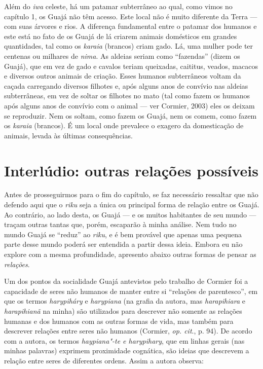 Além do \emph{iwa} celeste, há um patamar subterrâneo ao qual, como
vimos no capítulo 1, os Guajá não têm acesso. Este local não é muito
diferente da Terra --- com suas árvores e rios. A diferença fundamental
entre o patamar dos humanos e este está no fato de os Guajá de lá
criarem animais domésticos em grandes quantidades, tal como os
\emph{karaia} (brancos) criam gado. Lá, uma mulher pode ter centenas ou
milhares de \emph{nima}. As aldeias seriam como ``fazendas'' (dizem os
Guajá), que em vez de gado e cavalos teriam queixadas, caititus, veados,
macacos e diversos outros animais de criação. Esses humanos subterrâneos
voltam da caçada carregando diversos filhotes e, após alguns anos de
convívio nas aldeias subterrâneas, em vez de soltar os filhotes no mato
(tal como fazem os humanos após alguns anos de convívio com o animal ---
ver Cormier, 2003) eles os deixam se reproduzir. Nem os soltam, como
fazem os Guajá, nem os comem, como fazem os \emph{karaia} (brancos). É
um local onde prevalece o exagero da domesticação de animais, levada às
últimas consequências.

\section{Interlúdio: outras relações
possíveis}\label{interluxfadio-outras-relauxe7uxf5es-possuxedveis}

Antes de prosseguirmos para o fim do capítulo, se faz necessário
ressaltar que não defendo aqui que o \emph{riku} seja a única ou
principal forma de relação entre os Guajá. Ao contrário, ao lado desta,
os Guajá --- e os muitos habitantes de seu mundo --- traçam outras tantas
que, porém, escaparão à minha análise. Nem tudo no mundo Guajá se
``reduz'' ao \emph{riku}, e é bem provável que apenas uma pequena parte
desse mundo poderá ser entendida a partir dessa ideia. Embora eu não
explore com a mesma profundidade, apresento abaixo outras formas de
pensar as \emph{relações}.

Um dos pontos da socialidade Guajá antevistos pelo trabalho de Cormier
foi a capacidade de seres não humanos de manter entre si ``relações de
parentesco'', em que os termos \emph{harypiháry} e \emph{harypiana} (na
grafia da autora, mas \emph{harapihiara} e \emph{harapihianã} na minha)
são utilizados para descrever não somente as relações humanas e dos
humanos com as outras formas de vida, mas também para descrever relações
entre seres não humanos (Cormier, \emph{op. cit}., p. 94). De acordo com a
autora, os termos \emph{haypiana"-te e harypihary}, que em linhas gerais
(nas minhas palavras) exprimem proximidade cognática, são ideias que
descrevem a relação entre seres de diferentes ordens. Assim a autora
observa:

